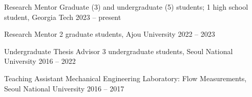 
\begin{cvhonors}

  \cvhonor
    {Research Mentor}
    {Graduate (3) and undergraduate (5) students; 1 high school student, Georgia Tech}
    {}
    {2023 -- present}

  \cvhonor
    {Research Mentor}
    {2 graduate students, Ajou University}
    {}
    {2022 -- 2023}

  \cvhonor
    {Undergraduate Thesis Advisor}
    {3 undergraduate students, Seoul National University}
    {}
    {2016 -- 2022}

  \cvhonor
    {Teaching Assistant}
    {Mechanical Engineering Laboratory: Flow Measurements, Seoul National University}
    {}
    {2016 -- 2017}

\end{cvhonors}
